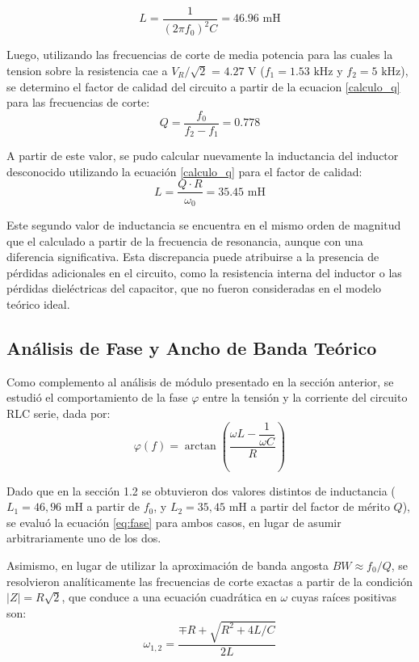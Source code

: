 \begin{equation}
L = \frac{1}{(2\pi f_0)^2 C} = 46.96\text{ mH}
\end{equation}

Luego, utilizando las frecuencias de corte de media potencia para las cuales la tension sobre la resistencia cae a $V_R/\sqrt{2}$ = $4.27\text{ V}$ ($f_1 = 1.53\text{ kHz}$ y $f_2 = 5\text{ kHz}$), se determino el factor de calidad del circuito a partir de la ecuacion \ref{calculo_q} para las frecuencias de corte:
\begin{equation}
Q = \frac{f_0}{f_2 - f_1} = 0.778
\end{equation}

A partir de este valor, se pudo calcular nuevamente la inductancia del inductor desconocido utilizando la ecuación \ref{calculo_q} para el factor de calidad:
\begin{equation}
L = \frac{Q \cdot R}{\omega_0} = 35.45\text{ mH}
\end{equation}

Este segundo valor de inductancia se encuentra en el mismo orden de magnitud que el calculado a partir de la frecuencia de resonancia, aunque con una diferencia significativa. Esta discrepancia puede atribuirse a la presencia de pérdidas adicionales en el circuito, como la resistencia interna del inductor o las pérdidas dieléctricas del capacitor, que no fueron consideradas en el modelo teórico ideal.


\subsection{Análisis de Fase y Ancho de Banda Teórico}

Como complemento al análisis de módulo presentado en la sección anterior, se estudió el comportamiento de la fase $\varphi$ entre la tensión y la corriente del circuito RLC serie, dada por:
\begin{equation}
\varphi(f) = \arctan\left(\frac{\omega L - \dfrac{1}{\omega C}}{R}\right)
\label{eq:fase}
\end{equation}

Dado que en la sección 1.2 se obtuvieron dos valores distintos de inductancia ($L_1 = 46{,}96$ mH a partir de $f_0$, y $L_2 = 35{,}45$ mH a partir del factor de mérito $Q$), se evaluó la ecuación \ref{eq:fase} para ambos casos, en lugar de asumir arbitrariamente uno de los dos.

Asimismo, en lugar de utilizar la aproximación de banda angosta $BW \approx f_0/Q$, se resolvieron analíticamente las frecuencias de corte exactas a partir de la condición $|Z| = R\sqrt{2}$, que conduce a una ecuación cuadrática en $\omega$ cuyas raíces positivas son:
\begin{equation}
\omega_{1,2} = \frac{\mp R + \sqrt{R^2 + 4L/C}}{2L}
\label{eq:cortes}
\end{equation}

